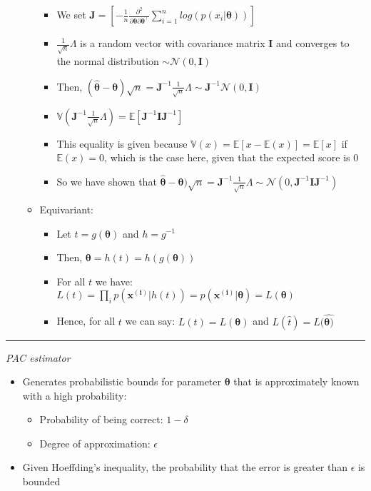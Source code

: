 \begin{itemize}
\begin{itemize}
\begin{itemize}
            \item We set $\boldsymbol{J} = [ -\frac{1}{n} \frac{\partial^2}{\partial \boldsymbol{\theta} \partial \boldsymbol{\theta}^\intercal} \sum_{i=1}^n log (p( x_i | \boldsymbol{\theta})) ]$
            \item $\frac{1}{\sqrt{n}} \Lambda$ is a random vector with covariance matrix $\boldsymbol{I}$ and converges to the normal distribution $\sim \mathcal{N}(0,\boldsymbol{I})$
            \item Then, $( \hat{\boldsymbol{\theta}} - \boldsymbol{\theta} ) \sqrt{n} = \boldsymbol{J}^{-1} \frac{1}{\sqrt{n}} \Lambda \sim \boldsymbol{J}^{-1}\mathcal{N}(0,\boldsymbol{I})$
            \item $\mathbb{V}(\boldsymbol{J}^{-1} \frac{1}{\sqrt{n}} \Lambda) = \mathbb{E}[\boldsymbol{J}^{-1}  \boldsymbol{I} \boldsymbol{J}^{-1}]$ 
            \item This equality is given because $\mathbb{V}(x) = \mathbb{E}[x-\mathbb{E}(x)] = \mathbb{E}[x]$ if $\mathbb{E}(x) = 0$, which is the case here, given that the expected score is $0$
            \item So we have shown that $\hat{\boldsymbol{\theta}} - \boldsymbol{\theta} ) \sqrt{n} = \boldsymbol{J}^{-1} \frac{1}{\sqrt{n}} \Lambda \sim \mathcal{N}(0,\boldsymbol{J}^{-1}\boldsymbol{I}\boldsymbol{J}^{-1})$
        \end{itemize}
        \item Equivariant: 
        \begin{itemize}
            \item Let $t = g(\boldsymbol{\theta})$ and $h = g^{-1}$ 
            \item Then, $\boldsymbol{\theta} = h(t) = h(g(\boldsymbol{\theta}))$
            \item For all $t$ we have: $L(t) = \prod_i p(\boldsymbol{x^({i})} | h(t)) = p(\boldsymbol{x^({i})} | \boldsymbol{\theta}) = L(\boldsymbol{\theta})$
            \item Hence, for all $t$ we can say: $L(t) = L(\boldsymbol{\theta})$ and $L(\hat{t}) = L(\hat{\boldsymbol{\theta})}$
        \end{itemize}
    \end{itemize}
\end{itemize}

{\color{lightgray}\hrule height 0.001mm}

\emph{PAC estimator}
\begin{itemize}
    \item Generates probabilistic bounds for parameter $\boldsymbol{\theta}$ that is approximately known with a high probability:
    \begin{itemize}
        \item Probability of being correct: $1-\delta$
        \item Degree of approximation: $\epsilon$
    \end{itemize}
    \item Given Hoeffding's inequality, the probability that the error is greater than $\epsilon$ is bounded
\end{itemize}

